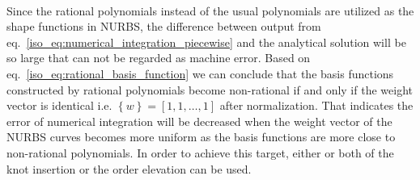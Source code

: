 \paragraph{}
Since the rational polynomials instead of the usual polynomials are utilized as the shape functions in NURBS, the difference between
    output from eq.~\ref{iso_eq:numerical_integration_piecewise} and the analytical solution will be so large that can not be regarded as
    machine error.
Based on eq.~\ref{iso_eq:rational_basis_function} we can conclude that the basis functions constructed by rational polynomials become
    non-rational if and only if the weight vector is identical i.e. $\left\{ w \right\} = \left[ 1,1,\dots,1 \right]$ after normalization.
That indicates the error of numerical integration will be decreased when the weight vector of the NURBS curves becomes more uniform as
    the basis functions are more close to non-rational polynomials.
In order to achieve this target, either or both of the knot insertion or the order elevation can be used.
\pagebreak
